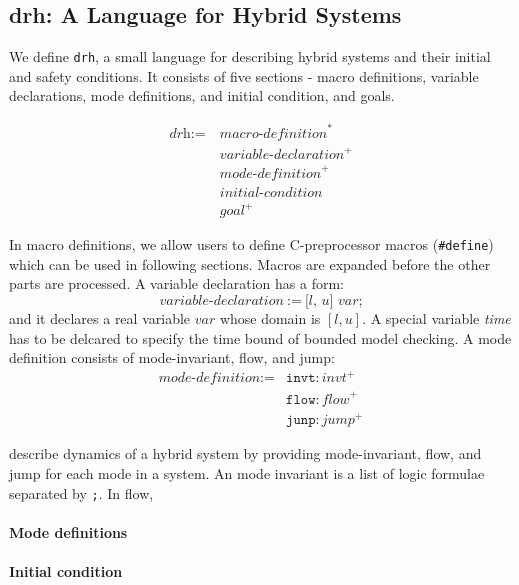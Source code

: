 \subsection{drh: A Language for Hybrid Systems}

We define \texttt{drh}, a small language for describing hybrid systems
and their initial and safety conditions. It consists of five sections
- macro definitions, variable declarations, mode definitions, and
initial condition, and goals.

\begin{align*}
  \textit{drh} := \ & \textit{macro-definition}^*\\
                  & \textit{variable-declaration}^+\\
                  & \textit{mode-definition}^+\\
                  & \textit{initial-condition}\\
                  & \textit{goal}^+
\end{align*}

In macro definitions, we allow users to define C-preprocessor macros
(\texttt{\#define}) which can be used in following sections. Macros
are expanded before the other parts are processed. A variable
declaration has a form:
\[
\textit{variable-declaration} \ := \ \textit{[l, u] var;}
\]
and it declares a real variable $var$ whose domain is $[l, u]$. A special
variable \textit{time} has to be delcared to specify the time bound of
bounded model checking. A mode definition consists of mode-invariant,
flow, and jump:
\begin{align*}
  \textit{mode-definition} := & \texttt{invt}:\textit{invt}^+\\
                              & \texttt{flow}:\textit{flow}^+\\
                              & \texttt{junp}:\textit{jump}^+
\end{align*}

 describe dynamics of a hybrid
system by providing mode-invariant, flow, and jump for each mode in a
system. An mode invariant is a list of logic formulae separated by
\texttt{;}. In flow,

\paragraph{Mode definitions}

\paragraph{Initial condition}

